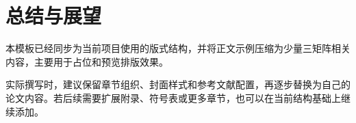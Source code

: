 \section{总结与展望}

本模板已经同步为当前项目使用的版式结构，并将正文示例压缩为少量三矩阵相关内容，主要用于占位和预览排版效果。

实际撰写时，建议保留章节组织、封面样式和参考文献配置，再逐步替换为自己的论文内容。若后续需要扩展附录、符号表或更多章节，也可以在当前结构基础上继续添加。
